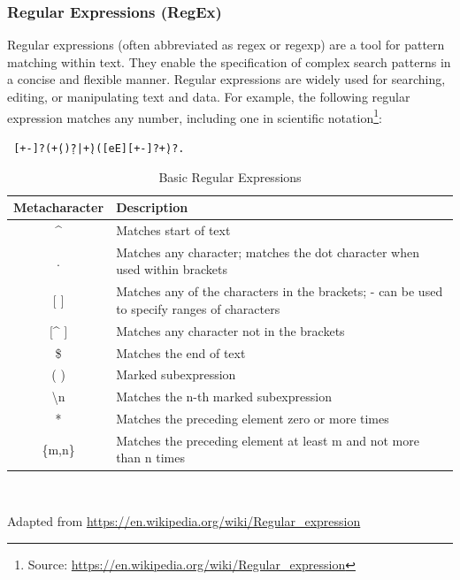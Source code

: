 \subsubsection*{Regular Expressions (RegEx)}

Regular expressions (often abbreviated as regex or regexp) are a tool for pattern matching within text. They enable the specification of complex search patterns in a concise and flexible manner. Regular expressions are widely used for searching, editing, or manipulating text and data. For example, the following regular expression matches any number, including one in scientific notation\footnote{Source: \url{https://en.wikipedia.org/wiki/Regular\_expression}}:

\noindent \texttt{
[+-]?(\d+(\.\d*)?|\.\d+)([eE][+-]?\d+)?.}

\begin{table}[h]
\small
\centering

\renewcommand{\arraystretch}{1.25}
\begin{tabularx}{\textwidth}{c|X} \hline
{\bf Metacharacter} & {\bf Description} \\ \hline \hline
\^{ } & Matches start of text \\ \hline
. & Matches any character; matches the dot character when used within brackets \\ \hline
$[$ $]$ & Matches any of the characters in the brackets; - can be used to specify ranges of characters \\ \hline
$[$\^{ } $]$ & Matches any character not in the brackets \\ \hline
\$ & Matches the end of text \\ \hline
( ) & Marked subexpression \\ \hline
\textbackslash n & Matches the n-th marked subexpression \\ \hline
* & Matches the preceding element zero or more times \\ \hline
\{m,n\} & Matches the preceding element at least m and not more than n times \\ \hline
\end{tabularx} \\
\vspace{.5\baselineskip}

{\footnotesize Adapted from \url{https://en.wikipedia.org/wiki/Regular_expression}} 

\caption{Basic Regular Expressions}
\label{tab:regexbasic}
\end{table}

